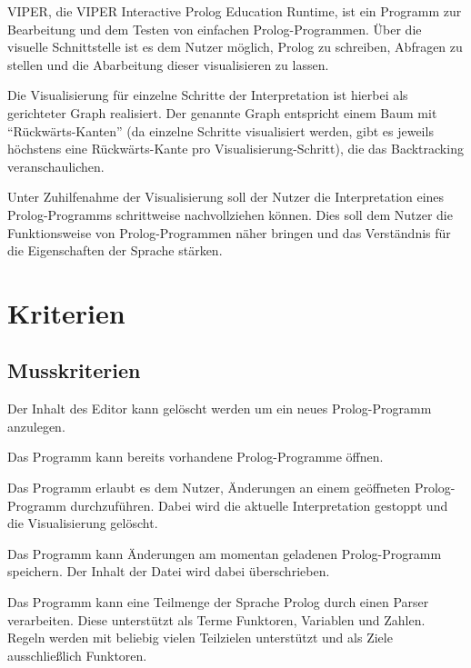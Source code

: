 \documentclass[parskip=full,11pt,twoside]{scrartcl}
\begin{document}
VIPER, die VIPER Interactive Prolog Education Runtime, ist ein Programm zur Bearbeitung und dem Testen von einfachen Prolog-Programmen. Über die visuelle Schnittstelle ist es dem Nutzer möglich, Prolog zu schreiben, Abfragen zu stellen und die Abarbeitung dieser visualisieren zu lassen.

Die Visualisierung für einzelne Schritte der Interpretation ist hierbei als gerichteter Graph realisiert. Der genannte Graph entspricht einem Baum mit \enquote{Rückwärts-Kanten} (da einzelne Schritte visualisiert werden, gibt es jeweils höchstens eine Rückwärts-Kante pro Visualisierung-Schritt), die das Backtracking veranschaulichen.

Unter Zuhilfenahme der Visualisierung soll der Nutzer die Interpretation eines Prolog-Programms schrittweise nachvollziehen können. Dies soll dem Nutzer die Funktionsweise von Prolog-Programmen näher bringen und das Verständnis für die Eigenschaften der Sprache stärken.

\section{Kriterien}

\subsection{Musskriterien}


Der Inhalt des Editor kann gelöscht werden um ein neues Prolog-Programm anzulegen.


Das Programm kann bereits vorhandene Prolog-Programme öffnen.


Das Programm erlaubt es dem Nutzer, Änderungen an einem geöffneten Prolog-Programm durchzuführen. Dabei wird die aktuelle Interpretation gestoppt und die Visualisierung gelöscht.


Das Programm kann Änderungen am momentan geladenen Prolog-Programm speichern. Der Inhalt der Datei wird dabei überschrieben.


Das Programm kann eine Teilmenge der Sprache Prolog durch einen Parser verarbeiten. Diese unterstützt als Terme Funktoren, Variablen und Zahlen. Regeln werden mit beliebig vielen Teilzielen unterstützt und als Ziele ausschließlich Funktoren.
\end{document}
